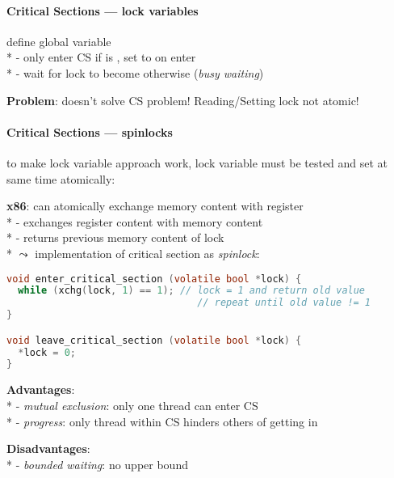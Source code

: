 \paragraph{Critical Sections --- lock variables}
\begin{items}
  \item define global  variable \\*
    - only enter CS if  is , set to  on enter \\*
    - wait for lock to become  otherwise (\emph{busy waiting})
  \item \textbf{Problem}: doesn't solve CS problem! Reading/Setting lock not atomic!
\end{items}

\paragraph{Critical Sections --- spinlocks}
\begin{items}
  \item to make lock variable approach work, lock variable must be tested and set at same time atomically:
  \item \textbf{x86}:  can atomically exchange memory content with register \\*
    - exchanges register content with memory content \\*
    - returns previous memory content of lock \\*
    \( \leadsto \) implementation of critical section as \emph{spinlock}:
  \begin{lstlisting}[language=c]
void enter_critical_section (volatile bool *lock) {
  while (xchg(lock, 1) == 1); // lock = 1 and return old value
                                 // repeat until old value != 1
}

void leave_critical_section (volatile bool *lock) {
  *lock = 0;
}
  \end{lstlisting}
  \item \textbf{Advantages}: \\*
    - \emph{mutual exclusion}: only one thread can enter CS \\*
    - \emph{progress}: only thread within CS hinders others of getting in
  \item \textbf{Disadvantages}: \\*
    - \emph{bounded waiting}: no upper bound
\end{items}

